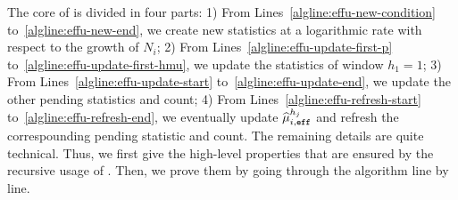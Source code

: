 The core of \EFF is divided in four parts: 1) From Lines~\ref{algline:effu-new-condition} to~\ref{algline:effu-new-end}, we create new statistics at a logarithmic rate with respect to the growth of $N_i$; 2) From Lines~\ref{algline:effu-update-first-p} to~\ref{algline:effu-update-first-hmu}, we update the statistics of window $h_1=1$;
3) From Lines~\ref{algline:effu-update-start} to~\ref{algline:effu-update-end}, we update the other pending statistics and count;
4) From Lines~\ref{algline:effu-refresh-start} to~\ref{algline:effu-refresh-end}, we eventually update $\widehat{\mu}_{i,\texttt{eff}}^{h_j}$ and refresh the correspounding pending statistic and count. The remaining details are quite technical. Thus, we first give the high-level properties that are ensured by the recursive usage of \EFF. Then, we prove them by going through the algorithm line by line.

